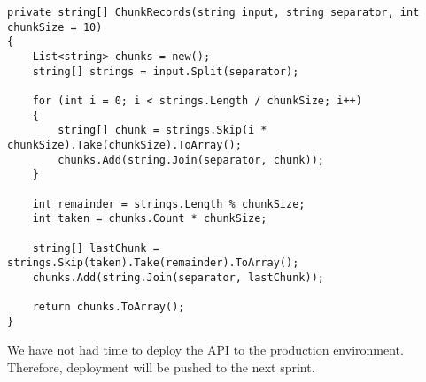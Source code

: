\begin{lstlisting}[language=CSharp, caption={Chunking logic for large queries}, label={lst:virtuoso_chunking}]
private string[] ChunkRecords(string input, string separator, int chunkSize = 10)
{
    List<string> chunks = new();
    string[] strings = input.Split(separator);
    
    for (int i = 0; i < strings.Length / chunkSize; i++)
    {
        string[] chunk = strings.Skip(i * chunkSize).Take(chunkSize).ToArray();
        chunks.Add(string.Join(separator, chunk));
    }

    int remainder = strings.Length % chunkSize;
    int taken = chunks.Count * chunkSize;

    string[] lastChunk = strings.Skip(taken).Take(remainder).ToArray();
    chunks.Add(string.Join(separator, lastChunk));
    
    return chunks.ToArray();
}
\end{lstlisting}

We have not had time to deploy the API to the production environment. Therefore, deployment will be pushed to the next sprint.